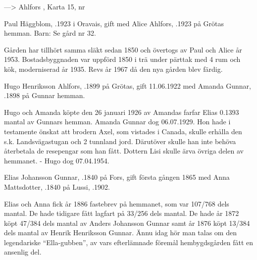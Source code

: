 ---> Ahlfors 	, Karta 15,  nr 


Paul Häggblom, .1923 i Oravais, gift med Alice Ahlfors, .1923 på Grötas hemman. Barn: Se gård nr 32.

Gården har tillhört samma släkt sedan 1850 och övertogs av Paul och Alice år 1953. Bostadsbyggnaden var uppförd 1850 i trä under pärttak med 4 rum och kök, moderniserad år 1935. Revs år 1967 då den nya gården blev färdig.


Hugo Henriksson Ahlfors, .1899 på Grötas, gift 11.06.1922 med Amanda Gunnar, .1898 på Gunnar hemman.
\begin{jhchildren}
  \item {}
  \item {}
\end{jhchildren}
Hugo och Amanda köpte den 26 januari 1926 av Amandas farfar Elias 0.1393 mantal av Gunnars hemman. Amanda Gunnar dog 06.07.1929. Hon hade i testamente önskat att brodern Axel, som vistades i Canada, skulle erhålla den s.k. Landsvägastugan och 2 tunnland jord. Därutöver skulle han inte behöva återbetala de resepengar som han fått. Dottern Lisi skulle ärva
övriga delen av hemmanet. - Hugo dog 07.04.1954.


Elias Johansson Gunnar, .1840 på Fors, gift första gången 1865 med Anna Mattsdotter, .1840 på Lussi, .1902.
\begin{jhchildren}
  \item {}
  \item {}
  \item {}
\end{jhchildren}
Elias och Anna fick år 1886 fastebrev på hemmanet, som var 107/768 dels mantal. De hade tidigare fått lagfart på 33/256 dels mantal. De hade år 1872 köpt 47/384 dels mantal av Anders Johansson Gunnar samt år 1876 köpt 13/384 dels mantal av Henrik Henriksson Gunnar. Ännu idag hör man talas om den legendariske ``Ella-gubben'', av vars efterlämnade föremål hembygdsgården fått en ansenlig del.

